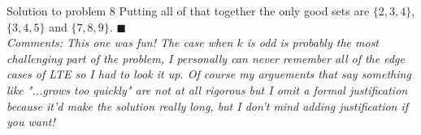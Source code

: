 \documentclass{article}
\begin{document}
\begin{solution}{Solution to problem 8}
Putting all of that together the only good sets are $\{2,3,4 \}$,
$\{ 3,4,5 \}$ and $\{7,8,9 \}$. $\blacksquare$
\\

\textit{Comments: This one was fun! The case when $k$ is odd is probably
the most challenging part of the problem, I personally can never remember
all of the edge cases of LTE so I had to look it up. Of course my arguements
that say something like "...grows too quickly" are not at all rigorous but
I omit
a formal justification because it'd make the solution really long, but I
don't mind adding justification if you want!}
\end{solution}
\end{document}
